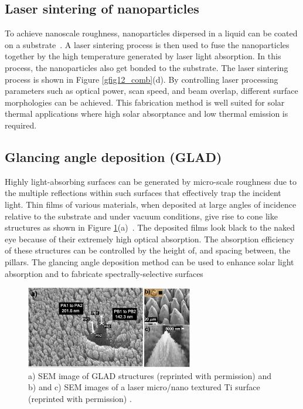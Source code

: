 \documentclass[review]{elsarticle}
\begin{document}
\subsection{Laser sintering of nanoparticles}
To achieve nanoscale roughness, nanoparticles dispersed in a liquid can be coated on a substrate~\cite{LaserProcessing}. A laser sintering process is then used to fuse the nanoparticles together by the high temperature generated by laser light absorption. In this process, the nanoparticles also get bonded to the substrate. The laser sintering process is shown in Figure \ref{gfig12_comb}(d).  By controlling laser processing parameters such as optical power, scan speed, and beam overlap, different surface morphologies can be achieved. This fabrication method is well suited for solar thermal applications where high solar absorptance and low thermal emission is required.

\subsection{Glancing angle deposition (GLAD)}
Highly light-absorbing surfaces can be generated by micro-scale roughness 
due to the multiple reflections within such surfaces that effectively trap the incident light.  
Thin films of various materials, when deposited at large angles of incidence
relative to the substrate and under vacuum conditions, give rise to cone like 
structures as shown in Figure \ref{gfig45_comb}(a)~\cite{GlancingAngle}. The deposited films look black to the 
naked eye because of their extremely high optical absorption.  The absorption efficiency of 
these structures can be controlled by the height of, and spacing between, the pillars.  
The glancing angle deposition method can be used to enhance solar light absorption 
and to fabricate spectrally-selective surfaces

\begin{figure}[ht!]
	\includegraphics[width=0.65\textwidth]{gfig45_comb}
	\caption{\label{gfig45_comb} a) SEM image of GLAD structures (reprinted with permission) \cite{gfig4ref} and b) and c) SEM images of a laser micro/nano textured Ti surface (reprinted with permission) \cite{g28}.} %
\end{figure} 
\end{document}

